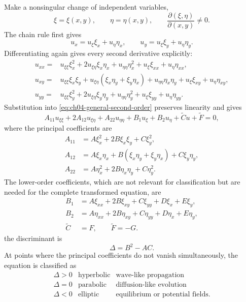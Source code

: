 Make a nonsingular change of independent variables,
\begin{equation}
\xi=\xi(x,y),\qquad \eta=\eta(x,y),\qquad
\frac{\partial(\xi,\eta)}{\partial(x,y)}\not=0.
\end{equation}
The chain rule first gives
\begin{equation}
u_x=u_\xi\xi_x+u_\eta\eta_x,
\qquad
u_y=u_\xi\xi_y+u_\eta\eta_y.
\end{equation}
Differentiating again gives every second derivative explicitly:
\begin{align}
u_{xx}={}&u_{\xi\xi}\xi_x^2+2u_{\xi\eta}\xi_x\eta_x
+u_{\eta\eta}\eta_x^2+u_\xi\xi_{xx}+u_\eta\eta_{xx},\\
u_{xy}={}&u_{\xi\xi}\xi_x\xi_y
+u_{\xi\eta}(\xi_x\eta_y+\xi_y\eta_x)
+u_{\eta\eta}\eta_x\eta_y+u_\xi\xi_{xy}+u_\eta\eta_{xy},\\
u_{yy}={}&u_{\xi\xi}\xi_y^2+2u_{\xi\eta}\xi_y\eta_y
+u_{\eta\eta}\eta_y^2+u_\xi\xi_{yy}+u_\eta\eta_{yy}.
\end{align}
Substitution into \eqref{eq:ch04-general-second-order} preserves linearity and gives
\begin{equation}
A_{11}u_{\xi\xi}+2A_{12}u_{\xi\eta}+A_{22}u_{\eta\eta}
+B_1u_\xi+B_2u_\eta+\widetilde C u+\widetilde F=0,
\label{eq:ch04-transformed-pde}
\end{equation}
where the principal coefficients are
\begin{align}
A_{11}&=A\xi_x^2+2B\xi_x\xi_y+C\xi_y^2,\\
A_{12}&=A\xi_x\eta_x+B(\xi_x\eta_y+\xi_y\eta_x)+C\xi_y\eta_y,\\
A_{22}&=A\eta_x^2+2B\eta_x\eta_y+C\eta_y^2.
\end{align}
The lower-order coefficients, which are not relevant for classification but are needed for the complete transformed equation, are
\begin{align}
B_1&=A\xi_{xx}+2B\xi_{xy}+C\xi_{yy}+D\xi_x+E\xi_y,\\
B_2&=A\eta_{xx}+2B\eta_{xy}+C\eta_{yy}+D\eta_x+E\eta_y,\\
\widetilde C&=F,\qquad \widetilde F=-G.
\end{align}
the discriminant is
\begin{equation}
\Delta=B^2-AC.
\end{equation}
At points where the principal coefficients do not vanish simultaneously, the equation is classified as
\begin{equation}
\begin{array}{c|c|c}
\Delta>0 & \text{hyperbolic} & \text{wave-like propagation}\\
\Delta=0 & \text{parabolic} & \text{diffusion-like evolution}\\
\Delta<0 & \text{elliptic} & \text{equilibrium or potential fields}.
\end{array}
\end{equation}

